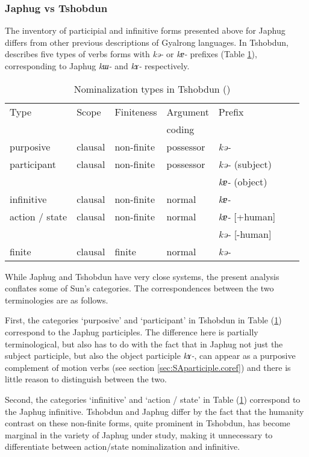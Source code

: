 \documentclass[oneside,a4paper,11pt]{article}
\newcommand{\ipa}[1]{\textit{\phon#1}}
\begin{document}
\subsubsection{Japhug vs Tshobdun} \label{sec:tshobdun.k}
The inventory of participial and infinitive forms presented above for Japhug differs from other previous descriptions of Gyalrong languages. In Tshobdun, \citet[476]{sun12complementation} describes five types of verbs forms with \ipa{kə-} or \ipa{kɐ-} prefixes (Table \ref{tab:tshobdun.nmlz}), corresponding to Japhug \ipa{kɯ-} and \ipa{kɤ-} respectively.

\begin{table}[H]
\caption{Nominalization types in Tshobdun (\citealt[476]{sun12complementation}) } \label{tab:tshobdun.nmlz} \centering
\begin{tabular}{lllllll}
\toprule
Type & Scope & Finiteness & Argument & Prefix \\
&&&coding \\
\midrule
purposive & clausal & non-finite& possessor & \ipa{kə-} \\
participant & clausal & non-finite& possessor & \ipa{kə-} (subject) \\
&&&& \ipa{kɐ-} (object)\\
infinitive & clausal & non-finite& normal &  \ipa{kɐ-}  \\
action / state & clausal & non-finite& normal &  \ipa{kɐ-} [+human] \\
&&&&\ipa{kə-}  [-human] \\
finite  & clausal & finite& normal &  \ipa{kə-} \\
\bottomrule
\end{tabular}
\end{table}

While Japhug and Tshobdun have very close systems, the present analysis conflates some of Sun's categories. The correspondences between the two terminologies are as follows.

First, the categories `purposive' and `participant' in Tshobdun in Table (\ref{tab:tshobdun.nmlz}) correspond to the Japhug participles. The difference here is partially terminological, but also has to do with the fact that in Japhug not just the subject participle, but also the object participle \ipa{kɤ-}, can appear as a purposive complement of motion verbs (see section \ref{sec:SAparticiple.coref}) and there is little reason to distinguish between the two.

Second, the categories `infinitive' and `action / state' in Table (\ref{tab:tshobdun.nmlz}) correspond to the Japhug infinitive. Tshobdun and Japhug differ by the fact that the humanity contrast on these non-finite forms, quite prominent in Tshobdun, has become marginal in the variety of Japhug under study, making it unnecessary to differentiate between action/state nominalization and infinitive.
\end{document}
